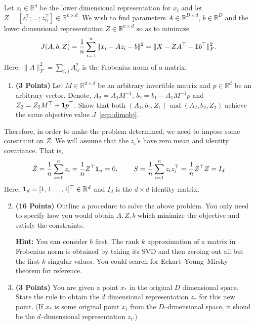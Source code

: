 \documentclass[letter]{article}
\newcommand*{\one}{{\bf 1}}
\newcommand{\Zbarr}{\bar{Z}}
\theoremstyle{definition}
\newcommand{\RR}{\mathbb{R}}
\begin{document}
Let $z_i\in \RR^d$ be the lower dimensional representation for $x_i$ and
let $Z = [z_1^\top; \dots; z_n^\top] \in \RR^{n\times d}$.
We wish to find parameters $A \in \RR^{D\times d}$, $b\in\RR^D$ and the lower
dimensional representation $Z\in \RR^{n\times d}$ so as to minimize 
\begin{equation}
J(A,b,Z) = \frac{1}{n} \sum_{i=1}^n \|x_i - Az_i - b\|^2 = \| X - ZA^\top - \one b^\top\|_F^2.
\label{eqn:dimobj}
\end{equation}
Here, $\|A\|^2_F = \sum_{i,j} A_{ij}^2$ is the Frobenius norm of a matrix.


\begin{enumerate}
\item \textbf{(3 Points)}
Let $M\in\RR^{d\times d}$ be an arbitrary invertible matrix and $p\in\RR^{d}$ be an arbitrary vector.
Denote, $A_2 = A_1M^{-1}$, $b_2 = b_1- A_1M^{-1}p$ and $Z_2 = Z_1 M^\top +
\one p^\top$.
Show that both
$(A_1, b_1, Z_1)$ and $(A_2, b_2, Z_2)$ achieve the same objective value $J$~\eqref{eqn:dimobj}.
\end{enumerate}

Therefore, in order to make the problem determined, we need to impose some
constraint on $Z$. We will assume that the $z_i$'s have zero mean and identity covariance.
That is,
\begin{align*}
\Zbarr = \frac{1}{n} \sum_{i=1}^n z_i =\frac{1}{n} Z^\top {\bf 1}_n = 0, \hspace{0.3in} 
S = \frac{1}{n} \sum_{i=1}^n z_i z_i^\top 
= \frac{1}{n} Z^\top Z
= I_d
\end{align*}
Here, ${\bf 1}_d = [1, 1 \dots, 1]^\top \in\RR^d$ and $I_d$  is the $d\times d$ identity matrix.

\begin{enumerate}
\setcounter{enumi}{1}
\item \textbf{(16 Points)}
Outline a procedure to solve the above problem. You only need to specify how you
would obtain $A, Z, b$ which minimize the objective and satisfy the constraints. 

\textbf{Hint: }You can consider $b$ first. The rank $k$ approximation of a matrix in Frobenius norm is obtained by
taking its SVD and then zeroing out all but the first $k$ singular values. 
You could search for Eckart–Young–Mirsky theorem for reference.
\item \textbf{(3 Points)}
You are given a point $x_*$ in the original $D$ dimensional space.
State the rule to obtain the $d$ dimensional
representation $z_*$ for this new point.
(If $x_*$ is some original point $x_i$ from the $D$--dimensional space, it shoud be the
$d$--dimensional representation $z_i$.)


\end{enumerate}
\end{document}
